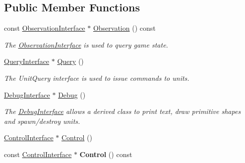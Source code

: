 \subsection*{Public Member Functions}
\begin{DoxyCompactItemize}
\item 
\mbox{\label{classsc2_1_1_client_a9bde4735245a945f37c5505cde5d09c1}} 
const \hyperlink{classsc2_1_1_observation_interface}{Observation\+Interface} $\ast$ \hyperlink{classsc2_1_1_client_a9bde4735245a945f37c5505cde5d09c1}{Observation} () const
\begin{DoxyCompactList}\small\item\em The \hyperlink{classsc2_1_1_observation_interface}{Observation\+Interface} is used to query game state. \end{DoxyCompactList}\item 
\mbox{\label{classsc2_1_1_client_acdc61fe5c58e0a8f4f246d8fbcc5cefc}} 
\hyperlink{classsc2_1_1_query_interface}{Query\+Interface} $\ast$ \hyperlink{classsc2_1_1_client_acdc61fe5c58e0a8f4f246d8fbcc5cefc}{Query} ()
\begin{DoxyCompactList}\small\item\em The Unit\+Query interface is used to issue commands to units. \end{DoxyCompactList}\item 
\mbox{\label{classsc2_1_1_client_ac42601e18b7c109f6f0e58a7780a79ac}} 
\hyperlink{classsc2_1_1_debug_interface}{Debug\+Interface} $\ast$ \hyperlink{classsc2_1_1_client_ac42601e18b7c109f6f0e58a7780a79ac}{Debug} ()
\begin{DoxyCompactList}\small\item\em The \hyperlink{classsc2_1_1_debug_interface}{Debug\+Interface} allows a derived class to print text, draw primitive shapes and spawn/destroy units. \end{DoxyCompactList}\item 
\hyperlink{classsc2_1_1_control_interface}{Control\+Interface} $\ast$ \hyperlink{classsc2_1_1_client_a741b9dd091f11694dd814c9b01f86dd8}{Control} ()
\item 
\mbox{\label{classsc2_1_1_client_a90089d27b898fe537ccee87def3cec4b}} 
const \hyperlink{classsc2_1_1_control_interface}{Control\+Interface} $\ast$ {\bfseries Control} () const
\end{DoxyCompactItemize}


